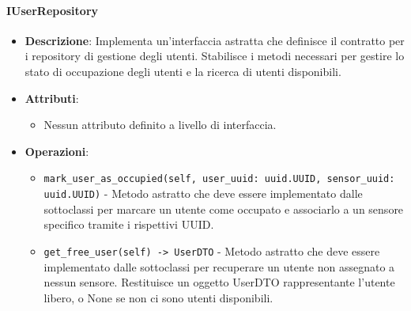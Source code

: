 \documentclass[10pt]{article}
\begin{document}
    \paragraph{IUserRepository}
    \begin{itemize} 
    \item \textbf{Descrizione}: Implementa un'interfaccia astratta che definisce il contratto per i repository di gestione degli utenti. Stabilisce i metodi necessari per gestire lo stato di occupazione degli utenti e la ricerca di utenti disponibili.
    \item \textbf{Attributi}:
    \begin{itemize}
        \item Nessun attributo definito a livello di interfaccia.
    \end{itemize}
    
    \item \textbf{Operazioni}:
    \begin{itemize}
        \item \texttt{mark\_user\_as\_occupied(self, user\_uuid: uuid.UUID, sensor\_uuid: uuid.UUID)} - Metodo astratto che deve essere implementato dalle sottoclassi per marcare un utente come occupato e associarlo a un sensore specifico tramite i rispettivi UUID.
        
        \item \texttt{get\_free\_user(self) -> UserDTO} - Metodo astratto che deve essere implementato dalle sottoclassi per recuperare un utente non assegnato a nessun sensore. Restituisce un oggetto UserDTO rappresentante l'utente libero, o None se non ci sono utenti disponibili.
    \end{itemize}
    \end{itemize}
\end{document}

